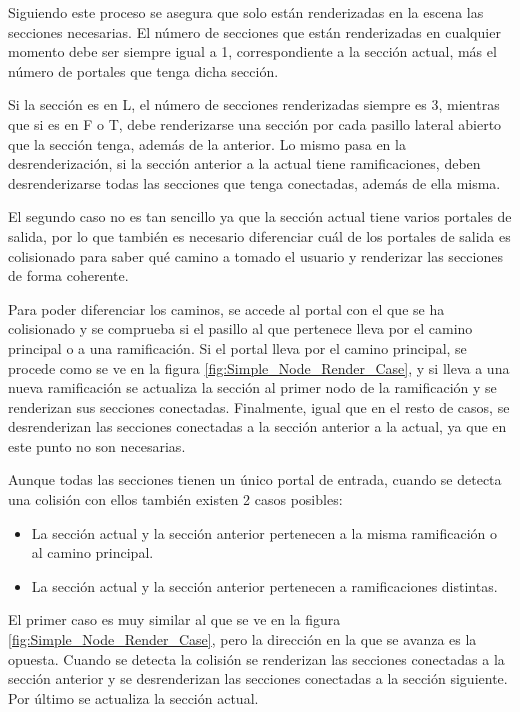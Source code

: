 \documentclass[../main.tex]{subfiles}
\begin{document}
Siguiendo este proceso se asegura que solo están renderizadas en la escena las secciones necesarias. El número de secciones que están renderizadas en cualquier momento debe ser siempre igual a 1, correspondiente a la sección actual, más el número de portales que tenga dicha sección. 

Si la sección es en L, el número de secciones renderizadas siempre es 3, mientras que si es en F o T, debe renderizarse una sección por cada pasillo lateral abierto que la sección tenga, además de la anterior. Lo mismo pasa en la desrenderización, si la sección anterior a la actual tiene ramificaciones, deben desrenderizarse todas las secciones que tenga conectadas, además de ella misma.

El segundo caso no es tan sencillo ya que la sección actual tiene varios portales de salida, por lo que también es necesario diferenciar cuál de los portales de salida es colisionado para saber qué camino a tomado el usuario y renderizar las secciones de forma coherente.

Para poder diferenciar los caminos, se accede al portal con el que se ha colisionado y se comprueba si el pasillo al que pertenece lleva por el camino principal o a una ramificación. Si el portal lleva por el camino principal, se procede como se ve en la figura \ref{fig:Simple_Node_Render_Case}, y si lleva a una nueva ramificación se actualiza la sección al primer nodo de la ramificación y se renderizan sus secciones conectadas. Finalmente, igual que en el resto de casos, se desrenderizan las secciones conectadas a la sección anterior a la actual, ya que en este punto no son necesarias.

Aunque todas las secciones tienen un único portal de entrada, cuando se detecta una colisión con ellos también existen 2 casos posibles:

\begin{itemize}
    \item La sección actual y la sección anterior pertenecen a la misma ramificación o al camino principal.
    \item La sección actual y la sección anterior pertenecen a ramificaciones distintas.
\end{itemize}

El primer caso es muy similar al que se ve en la figura \ref{fig:Simple_Node_Render_Case}, pero la dirección en la que se avanza es la opuesta. Cuando se detecta la colisión se renderizan las secciones conectadas a la sección anterior y se desrenderizan las secciones conectadas a la sección siguiente. Por último se actualiza la sección actual.
\end{document}

